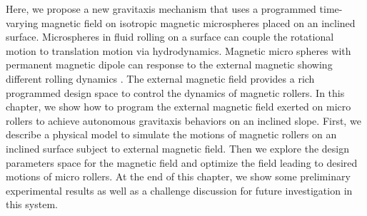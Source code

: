 Here, we propose a new gravitaxis mechanism that uses a programmed time-varying magnetic field on isotropic magnetic microspheres placed on an inclined surface. Microspheres in fluid rolling on a surface can couple the rotational motion to translation motion via hydrodynamics\autocite{galvin2001time,rashidi2016theoretical}. Magnetic micro spheres with permanent magnetic dipole  can response to the external  magnetic showing different rolling dynamics \autocite{helgesen2019propulsion,helgesen2018magnetic}.
The external magnetic field provides a rich programmed design space to control the dynamics of magnetic rollers.
In this chapter, we show how to program the external magnetic field exerted on  micro rollers to achieve autonomous gravitaxis behaviors on an inclined slope. First, we describe a physical model to simulate the motions of magnetic rollers on an inclined surface subject to external magnetic field. Then we explore the design parameters space for the magnetic field  and optimize the field leading to desired motions of  micro rollers. At the end of this chapter, we show some preliminary experimental results as well as a challenge discussion for future investigation in this system. 

